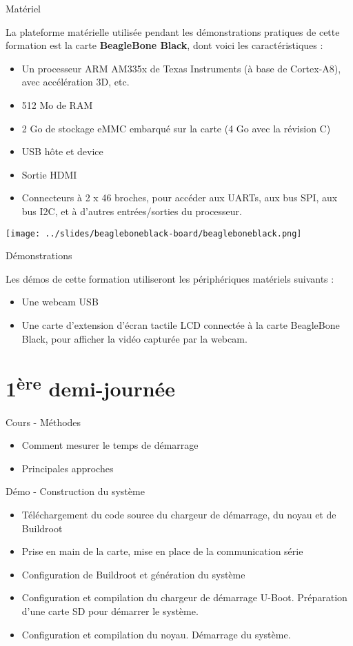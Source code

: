 \documentclass[a4paper,12pt,obeyspaces,spaces,hyphens]{article}
\begin{document}
\feshowtitle

\feshowinfo

\feagendatwocolumn
{Matériel}
{
  La plateforme matérielle utilisée pendant les démonstrations pratiques de
  cette formation est la carte {\bf BeagleBone Black}, dont voici les
  caractéristiques :

  \begin{itemize}
  \item Un processeur ARM AM335x de Texas Instruments (à base de
    Cortex-A8), avec accélération 3D, etc.
  \item 512 Mo de RAM
  \item 2 Go de stockage eMMC embarqué sur la carte
        \newline(4 Go avec la révision C)
  \item USB hôte et device
  \item Sortie HDMI
  \item Connecteurs à 2 x 46 broches, pour accéder aux UARTs, aux
        bus SPI, aux bus I2C, et à d'autres entrées/sorties du
        processeur.
  \end{itemize}
}
{}
{
  \begin{center}
    \texttt{[image: ../slides/beagleboneblack-board/beagleboneblack.png]}
  \end{center}
}

\feagendaonecolumn
{Démonstrations}
{
  Les démos de cette formation utiliseront les périphériques matériels suivants :

  \begin{itemize}
  \item Une webcam USB
  \item Une carte d'extension d'écran tactile LCD connectée à la carte
    BeagleBone Black, pour afficher la vidéo capturée par la webcam.
  \end{itemize}
}

\section{1\textsuperscript{ère} demi-journée}

\feagendatwocolumn
{Cours - Méthodes}
{
  \begin{itemize}
  \item Comment mesurer le temps de démarrage
  \item Principales approches
  \end{itemize}
}
{Démo - Construction du système}
{
 \begin{itemize}
 \item Téléchargement du code source du chargeur de démarrage, du noyau et de Buildroot
 \item Prise en main de la carte, mise en place de la communication série
 \item Configuration de Buildroot et génération du système
 \item Configuration et compilation du chargeur de démarrage U-Boot. Préparation d'une
       carte SD pour démarrer le système.
 \item Configuration et compilation du noyau. Démarrage du système.
 \end{itemize}
}
\end{document}
